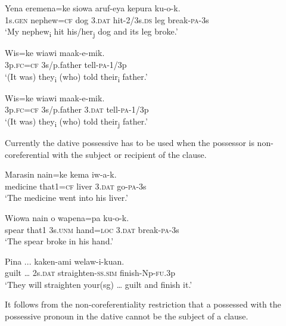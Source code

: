 \ea%
\label{ex:3:x1796}
\gll Yena eremena=ke siowa  aruf-eya kepura ku-o-k. \\
1s.\textsc{gen} nephew=\textsc{cf} dog 3.\textsc{dat} hit-2/3s.\textsc{ds} leg break-\textsc{pa}-3s\\
\glt`My nephew\textsubscript{i} hit his/her\textsubscript{j} dog and its leg broke.'
\z

\ea%
\label{ex:3:x1798}
\gll Wis=ke wiawi maak-e-mik. \\
3p.\textsc{fc}=\textsc{cf} 3s/p.father tell-\textsc{pa}-1/3p\\
\glt`(It was) they\textsubscript{i} (who) told their\textsubscript{i} father.'
\z

\ea%
\label{ex:3:x1799}
\gll Wis=ke wiawi  maak-e-mik. \\
3p.\textsc{fc}=\textsc{cf} 3s/p.father 3.\textsc{dat} tell-\textsc{pa}-1/3p\\
\glt`(It was) they\textsubscript{i} (who) told their\textsubscript{j} father.'
\z

Currently the dative possessive has to be used when the possessor is non-coreferential with the subject or recipient of the clause.

\ea%
\label{ex:3:x588}
\gll Marasin nain=ke kema  iw-a-k. \\
medicine that1=\textsc{cf} liver 3.\textsc{dat} go-\textsc{pa}-3s\\
\glt`The medicine went into his liver.'
\z

\ea%
\label{ex:3:x853}
\gll Wiowa nain o wapena=pa   ku-o-k. \\
spear that1 3s.\textsc{unm} hand=\textsc{loc} 3.\textsc{dat} break-\textsc{pa}-3s\\
\glt`The spear broke in his hand.'
\z

\ea%
\label{ex:3:x1794}
\gll Pina ...  kaken-ami welaw-i-kuan. \\
guilt {\dots} 2s.\textsc{dat} straighten-\textsc{ss}.\textsc{sim} finish-Np-\textsc{fu}.3p\\
\glt`They will straighten your(sg) {\dots} guilt and finish it.'
\z

It follows from the non-coreferentiality restriction that a possessed  with the possessive pronoun in the dative cannot be the subject of a clause. 


